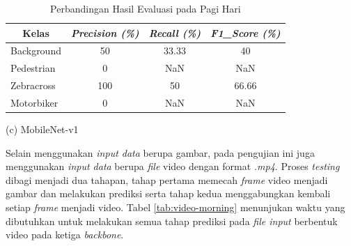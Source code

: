 \begin{table}[!h]
	\vfill
	\begin{minipage}[b]{\textwidth}
		\centering
		\begin{tabular}{|l|c|c|c|}
			\hline
			\multicolumn{1}{|c|}{\textbf{Kelas}} & \textit{\textbf{Precision (\%)}} & \textit{\textbf{Recall (\%)}} & \textit{\textbf{F1\_Score (\%)}} \\ \hline
			Background                           & 50                               & 33.33                         & 40                               \\ \hline
			Pedestrian                           & 0                                & NaN                           & NaN                              \\ \hline
			Zebracross                           & 100                              & 50                            & 66.66                            \\ \hline
			Motorbiker                           & 0                                & NaN                           & NaN                              \\ \hline
		\end{tabular}
		\caption*{(c) MobileNet-v1}
	\end{minipage}
	\caption{{Perbandingan Hasil Evaluasi pada Pagi Hari}}
	\label{tab:evaluate-morning}
\end{table}

Selain menggunakan \textit{input data} berupa gambar, pada pengujian ini juga menggunakan \textit{input data} berupa \textit{file} video dengan format \textit{.mp4}. Proses \textit{testing} dibagi menjadi dua tahapan, tahap pertama memecah \textit{frame} video menjadi gambar dan melakukan prediksi serta tahap kedua menggabungkan kembali setiap \textit{frame} menjadi video. Tabel \ref{tab:video-morning} menunjukan waktu yang dibutuhkan untuk melakukan semua tahap prediksi pada \textit{file input} berbentuk video pada ketiga \textit{backbone}.

